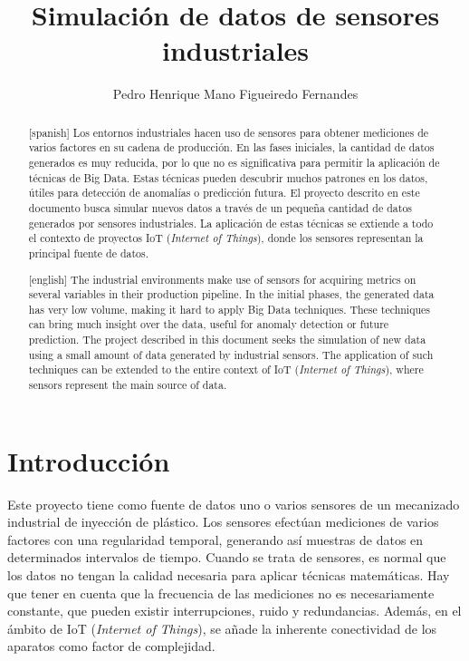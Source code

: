 \documentclass[11pt,spanish,listoffigures,listoftables]{tfgetsinf}
\title{Simulación de datos de sensores industriales}
\author{Pedro Henrique Mano Figueiredo Fernandes}
\begin{document}
\begin{abstract}[spanish]
Los entornos industriales hacen uso de sensores para obtener mediciones de varios factores en su cadena de producción. En las fases iniciales, la cantidad de datos generados es muy reducida, por lo que no es significativa para permitir la aplicación de técnicas de Big Data. Estas técnicas pueden descubrir muchos patrones en los datos, útiles para detección de anomalías o predicción futura. El proyecto descrito en este documento busca simular nuevos datos a través de un pequeña cantidad de datos generados por sensores industriales. La aplicación de estas técnicas se extiende a todo el contexto de proyectos IoT ({\em Internet of Things}), donde los sensores representan la principal fuente de datos. 
\end{abstract}

\begin{abstract}[english]
The industrial environments make use of sensors for acquiring metrics on several variables in their production pipeline. In the initial phases, the generated data has very low volume, making it hard to apply Big Data techniques. These techniques can bring much insight over the data, useful for anomaly detection or future prediction. The project described in this document seeks the simulation of new data using a small amount of data generated by industrial sensors. The application of such techniques can be extended to the entire context of IoT ({\em Internet of Things}), where sensors represent the main source of data.
\end{abstract}

\tableofcontents

\mainmatter

\chapter{Introducción}
Este proyecto tiene como fuente de datos uno o varios sensores de un mecanizado industrial de inyección de plástico. Los sensores efectúan mediciones de varios factores con una regularidad temporal, generando así muestras de datos en determinados intervalos de tiempo. Cuando se trata de sensores, es normal que los datos no tengan la calidad necesaria para aplicar técnicas matemáticas. Hay que tener en cuenta que la frecuencia de las mediciones no es necesariamente constante, que pueden existir interrupciones, ruido y redundancias. Además, en el ámbito de IoT ({\em Internet of Things}), se añade la inherente conectividad de los aparatos como factor de complejidad.
\end{document}
